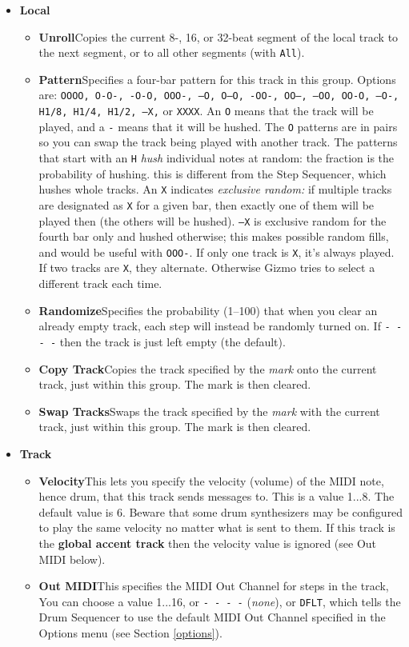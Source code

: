 \documentclass{article}
\begin{document}
\begin{itemize}
\item {\bf Local}
\begin{itemize}
\item {\bf Unroll}\quad Copies the current 8-, 16, or 32-beat segment of the local track to the next segment, or to all other segments (with \texttt{All}). 
\item {\bf Pattern}\quad Specifies a four-bar pattern for this track in this group.  Options are: \texttt{OOOO, O-O-, -O-O, OOO-, ---O, O--O, -OO-, OO--, --OO, OO-O, --O-, H1/8, H1/4, H1/2, ---X,} or {\tt XXXX}.  An {\tt O} means that the track will be played, and a {\tt -} means that it will be hushed.  The {\tt O} patterns are in pairs so you can swap the track being played with another track.  The patterns that start with an {\tt H} {\it hush} individual notes at random: the fraction is the probability of hushing.  this is different from the Step Sequencer, which hushes whole tracks.  An {\tt X} indicates {\it exclusive random:} if multiple tracks are designated as {\tt X} for a given bar, then exactly one of them will be played then (the others will be hushed).   {\tt ---X} is exclusive random for the fourth bar only and hushed otherwise; this makes possible random fills, and would be useful with {\tt OOO-}.  If only one track is {\tt X}, it's always played.  If two tracks are {\tt X}, they alternate.  Otherwise Gizmo tries to select a different track each time. 
\item {\bf Randomize}\quad Specifies the probability (1--100) that when you clear an already empty track, each step will instead be randomly turned on.  If \texttt{- - - -}  then the track is just left empty (the default).
\item {\bf Copy Track}\quad Copies the track specified by the {\it mark} onto the current track,  just within this group.  The mark is then cleared.
\item {\bf Swap Tracks}\quad Swaps the track specified by the {\it mark} with the current track, just within this group.  The mark is then cleared.
\end{itemize}

\item {\bf Track}
\begin{itemize}
\item {\bf Velocity}\quad This lets you specify the velocity (volume) of the MIDI note, hence drum, that this track sends messages to.  This is a value 1...8.   The default value is 6.  Beware that some drum synthesizers may be configured to play the same velocity no matter what is sent to them.   If this track is the {\bf global accent track} then the velocity value is ignored (see Out MIDI below).
\item {\bf Out MIDI}\quad This specifies the MIDI Out Channel for steps in the track,    You can choose a value 1...16, or \texttt{- - - -} ({\it none}), or \texttt{DFLT}, which tells the Drum Sequencer to use the default MIDI Out Channel specified in the Options menu (see Section \ref{options}).  


\end{itemize}
\end{itemize}
\end{document}
